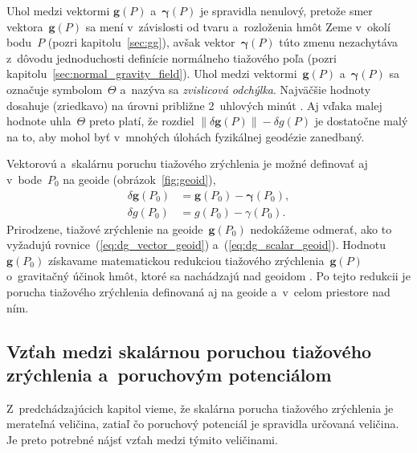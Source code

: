 \documentclass[a4paper, 12pt]{book}
\let\vec\mathbf
\begin{document}
Uhol medzi vektormi $\vec g(P)$ a~$\boldsymbol{\gamma}(P)$ je spravidla 
nenulový, pretože smer vektora~$\vec g(P)$ sa mení v~závislosti od tvaru 
a~rozloženia hmôt Zeme v~okolí bodu~$P$ (pozri kapitolu~\ref{sec:gg}), avšak 
vektor~$\boldsymbol \gamma(P)$ túto zmenu nezachytáva z~dôvodu jednoduchosti 
definície normálneho tiažového poľa (pozri 
kapitolu~\ref{sec:normal_gravity_field}).  Uhol medzi vektormi~$\vec g(P)$ 
a~$\boldsymbol \gamma(P)$ sa označuje symbolom~$\Theta$ a~nazýva sa 
\emph{zvislicová odchýlka}.  Najväčšie hodnoty dosahuje (zriedkavo) na úrovni 
približne 2~uhlových minút \parencite{GGMplus}.  Aj vďaka malej hodnote 
uhla~$\Theta$ preto platí, že rozdiel $\| \delta \vec g(P) \| - \delta g(P)$ je 
dostatočne malý na to, aby mohol byť v~mnohých úlohách fyzikálnej geodézie 
zanedbaný.

Vektorovú a~skalárnu poruchu tiažového zrýchlenia je možné definovať aj 
v~bode~$P_0$ na geoide (obrázok~\ref{fig:geoid}),
%
\begin{align}
\label{eq:dg_vector_geoid}
\delta \vec g(P_0) &= \vec g(P_0) - \boldsymbol \gamma(P_0){,}\\
%
\label{eq:dg_scalar_geoid}
\delta g(P_0) &= g(P_0) - \gamma(P_0){.}
\end{align}
%
Prirodzene, tiažové zrýchlenie na geoide~$\vec g(P_0)$ nedokážeme odmerať, ako 
to vyžadujú rovnice~(\ref{eq:dg_vector_geoid}) a~(\ref{eq:dg_scalar_geoid}).  
Hodnotu~$\vec g(P_0)$ získavame matematickou redukciou tiažového 
zrýchlenia~$\vec g(P)$ o~gravitačný účinok hmôt, ktoré sa nachádzajú nad 
geoidom \parencite[pozri][]{Janak2006}.  Po tejto redukcii je porucha tiažového 
zrýchlenia definovaná aj na geoide a~v~celom priestore nad ním.


\subsection{Vzťah medzi skalárnou poruchou tiažového zrýchlenia a~poruchovým 
potenciálom}

Z~predchádzajúcich kapitol vieme, že skalárna porucha tiažového zrýchlenia je 
merateľná veličina, zatiaľ čo poruchový potenciál je spravidla určovaná 
veličina.  Je preto potrebné nájsť vzťah medzi týmito veličinami.
\end{document}
